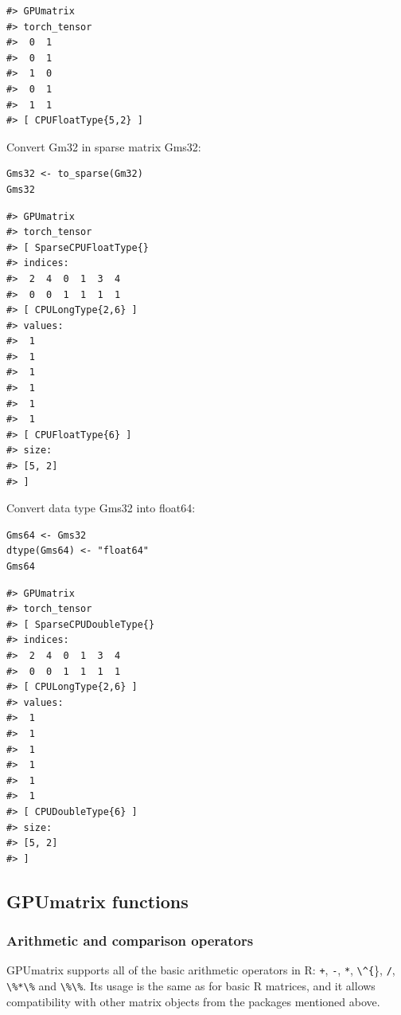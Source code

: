\begin{verbatim}
#> GPUmatrix
#> torch_tensor
#>  0  1
#>  0  1
#>  1  0
#>  0  1
#>  1  1
#> [ CPUFloatType{5,2} ]
\end{verbatim}

Convert Gm32 in sparse matrix Gms32:

\begin{verbatim}
Gms32 <- to_sparse(Gm32)
Gms32
\end{verbatim}

\begin{verbatim}
#> GPUmatrix
#> torch_tensor
#> [ SparseCPUFloatType{}
#> indices:
#>  2  4  0  1  3  4
#>  0  0  1  1  1  1
#> [ CPULongType{2,6} ]
#> values:
#>  1
#>  1
#>  1
#>  1
#>  1
#>  1
#> [ CPUFloatType{6} ]
#> size:
#> [5, 2]
#> ]
\end{verbatim}

Convert data type Gms32 into float64:

\begin{verbatim}
Gms64 <- Gms32
dtype(Gms64) <- "float64"
Gms64
\end{verbatim}

\begin{verbatim}
#> GPUmatrix
#> torch_tensor
#> [ SparseCPUDoubleType{}
#> indices:
#>  2  4  0  1  3  4
#>  0  0  1  1  1  1
#> [ CPULongType{2,6} ]
#> values:
#>  1
#>  1
#>  1
#>  1
#>  1
#>  1
#> [ CPUDoubleType{6} ]
#> size:
#> [5, 2]
#> ]
\end{verbatim}

\hypertarget{gpumatrix-functions}{%
\subsection{GPUmatrix functions}\label{gpumatrix-functions}}

\hypertarget{arithmetic-and-comparison-operators}{%
\subsubsection{Arithmetic and comparison operators}\label{arithmetic-and-comparison-operators}}

GPUmatrix supports all of the basic arithmetic operators in R: \texttt{+}, \texttt{-}, \texttt{*}, \texttt{\textbackslash{}\^{}\{}\}, \texttt{/}, \texttt{\textbackslash{}\%*\textbackslash{}\%} and \texttt{\textbackslash{}\%\textbackslash{}\%}. Its usage is the same as for basic R matrices, and it allows compatibility with other matrix objects from the packages mentioned above.

